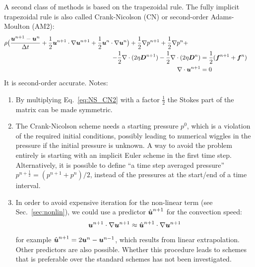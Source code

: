 A second class of methods is based on the trapezoidal rule. 
The fully implicit trapezoidal rule is also called Crank-Nicolson (CN) or second-order Adams-Moulton (AM2):
\begin{align}
 \rho \big( \frac{\boldsymbol{u}^{n+1}-\boldsymbol{u}^n}{\Delta t} +
     \frac12\boldsymbol{u}^{n+1} \cdot \nabla \boldsymbol{u}^{n+1} +
     \frac12\boldsymbol{u}^{n} \cdot \nabla \boldsymbol{u}^{n} \big) 
      + \frac12\nabla p^{n+1} 
      + \frac12\nabla p^{n} +  \qquad\notag\\
   - \frac12\nabla \cdot ( 2 \eta \boldsymbol{D}^{n+1})  
         - \frac12\nabla \cdot ( 2 \eta \boldsymbol{D}^{n}) &=\frac12(\boldsymbol{f}^{n+1}+\boldsymbol{f}^n)\\
\nabla \cdot \boldsymbol{u}^{n+1} &= 0
\label{eq:NS_CN2}
\end{align}
It is second-order accurate.
Notes:
\begin{enumerate}
   \item By multiplying Eq.~\ref{eq:NS_CN2} with a factor $\frac12$ the Stokes part of the matrix can be made symmetric.
   \item The Crank-Nicolson scheme needs a starting pressure $p^0$, which is a violation of the required initial conditions,
         possibly leading to numerical wiggles in the pressure if the initial pressure is unknown.
         A way to avoid the problem entirely is starting with an implicit Euler scheme in the first time step.
         Alternatively, it is possible to define ``a time step averaged pressure'' $p^{n+\frac12}=(p^{n+1}+p^{n})/2$, 
         instead of the pressures at the
         start/end of a time interval.
   \item In order to avoid expensive iteration for the non-linear term (see Sec.~\ref{sec:nonlin}), we could use a 
         predictor $\hat{\boldsymbol{u}}^{n+1}$ for the convection speed:
\begin{equation}
 \boldsymbol{u}^{n+1} \cdot \nabla \boldsymbol{u}^{n+1} \approx \hat{\boldsymbol{u}}^{n+1} \cdot \nabla \boldsymbol{u}^{n+1}
\label{eq:predictor_inertia}
\end{equation}
 for example $\hat{\boldsymbol{u}}^{n+1}=2\boldsymbol{u}^{n}-\boldsymbol{u}^{n-1}$, which results from linear extrapolation. Other predictors are also possible.
Whether this procedure leads to schemes that is preferable over the standard schemes has not been investigated.
\end{enumerate}

